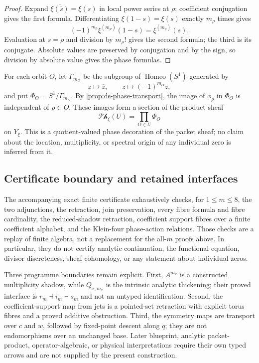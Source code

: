 \begin{proof}
Expand $\overline{\xi(\overline s)}=\xi(s)$ in local power series at $\rho$;
coefficient conjugation gives the first formula.  Differentiating
$\xi(1-s)=\xi(s)$ exactly $m_\rho$ times gives
\[
 (-1)^{m_\rho}\xi^{(m_\rho)}(1-s)=\xi^{(m_\rho)}(s).
\]
Evaluation at $s=\rho$ and division by $m_\rho!$ gives the second formula; the
third is its conjugate.  Absolute values are preserved by conjugation and by the
sign, so division by absolute value gives the phase formulas.
\end{proof}

For each orbit $O$, let $\Gamma_{m_O}$ be the subgroup of
$\operatorname{Homeo}(S^1)$ generated by
\[
 z\longmapsto\overline z,\qquad z\longmapsto(-1)^{m_O}z,
\]
and put $\Phi_O=S^1/\Gamma_{m_O}$.  By
\cref{prop:ds-phase-transport}, the image of $\phi_\rho$ in $\Phi_O$ is independent
of $\rho\in O$.  These images form a section of the product sheaf
\[
 \mathcal{Ph}_\xi(U)=\prod_{O\in U}\Phi_O
\]
on $Y_\xi$.  This is a quotient-valued phase decoration of the packet sheaf; no
claim about the location, multiplicity, or spectral origin of any individual zero
is inferred from it.

\subsection{Certificate boundary and retained interfaces}

The accompanying exact finite certificate exhaustively checks, for
$1\leq m\leq8$, the two adjunctions, the retraction, join preservation, every
fibre formula and fibre cardinality, the reduced-shadow retraction, coefficient
support fibres over a finite coefficient alphabet, and the Klein-four phase-action
relations.  Those checks are a replay of finite algebra, not a replacement for the
all-$m$ proofs above.  In particular, they do not certify analytic continuation,
the functional equation, divisor discreteness, sheaf cohomology, or any statement
about individual zeros.

Three programme boundaries remain explicit.  First, $A^{m_x}$ is a constructed
multiplicity shadow, while $Q_{x,m_x}$ is the intrinsic analytic thickening; their
proved interface is $r_m\dashv i_m\dashv s_m$ and not an untyped identification.
Second, the coefficient-support map from jets is a pointed-set retraction with
explicit torus fibres and a proved additive obstruction.  Third, the symmetry maps
are transport over $c$ and $w$, followed by fixed-point descent along $q$; they are
not endomorphisms over an unchanged base.  Later blueprint, analytic packet-product,
operator-algebraic, or physical interpretations require their own typed arrows and
are not supplied by the present construction.
